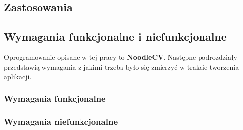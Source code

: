 \subsection{Zastosowania}

\subsection{Wymagania funkcjonalne i niefunkcjonalne}
Oprogramowanie opisane w tej pracy to \textbf{NoodleCV}. 
Następne podrozdziały przedstawią wymagania z jakimi trzeba było się zmierzyć w trakcie tworzenia aplikacji.
\subsubsection{Wymagania funkcjonalne}

\subsubsection{Wymagania niefunkcjonalne}

